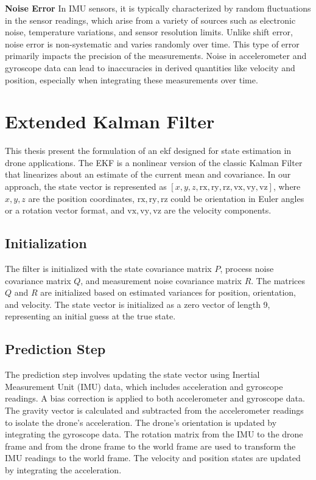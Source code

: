 \textbf{Noise Error} In IMU sensors, it is typically characterized by random fluctuations in the sensor readings, which arise from a variety of sources such as electronic noise, temperature variations, and sensor resolution limits. Unlike shift error, noise error is non-systematic and varies randomly over time. This type of error primarily impacts the precision of the measurements. Noise in accelerometer and gyroscope data can lead to inaccuracies in derived quantities like velocity and position, especially when integrating these measurements over time.

\section{Extended Kalman Filter}

This thesis present the formulation of an \acrfull{ekf} designed for state estimation in drone applications. The EKF is a nonlinear version of the classic Kalman Filter that linearizes about an estimate of the current mean and covariance. In our approach, the state vector is represented as \([x, y, z, \text{rx}, \text{ry}, \text{rz}, \text{vx}, \text{vy}, \text{vz}]\), where \(x, y, z\) are the position coordinates, \(\text{rx}, \text{ry}, \text{rz}\) could be orientation in Euler angles or a rotation vector format, and \(\text{vx}, \text{vy}, \text{vz}\) are the velocity components.

\subsection{Initialization}

The filter is initialized with the state covariance matrix \(P\), process noise covariance matrix \(Q\), and measurement noise covariance matrix \(R\). The matrices \(Q\) and \(R\) are initialized based on estimated variances for position, orientation, and velocity. The state vector is initialized as a zero vector of length 9, representing an initial guess at the true state.

\subsection{Prediction Step}

The prediction step involves updating the state vector using Inertial Measurement Unit (IMU) data, which includes acceleration and gyroscope readings. A bias correction is applied to both accelerometer and gyroscope data. The gravity vector is calculated and subtracted from the accelerometer readings to isolate the drone's acceleration. The drone's orientation is updated by integrating the gyroscope data. The rotation matrix from the IMU to the drone frame and from the drone frame to the world frame are used to transform the IMU readings to the world frame. The velocity and position states are updated by integrating the acceleration.

